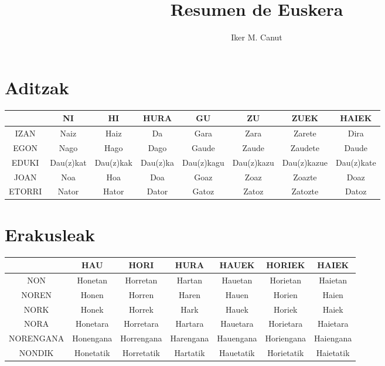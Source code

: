 \documentclass[12pt]{article}
\begin{document}
\author{Iker M. Canut}
\title{Resumen de Euskera}
\maketitle
\newpage

\tableofcontents
\newpage

\section{Aditzak}
\begin{table}[h]
\begin{center}
\begin{tabular}{|c||c|c|c|c|c|c|c|}
\hline
& NI & HI & HURA & GU & ZU & ZUEK & HAIEK \\
\hline \hline
IZAN & Naiz & Haiz & Da & Gara & Zara & Zarete & Dira \\
\hline
EGON & Nago & Hago & Dago & Gaude & Zaude & Zaudete & Daude \\
\hline
EDUKI & Dau(z)kat & Dau(z)kak & Dau(z)ka & Dau(z)kagu & Dau(z)kazu & Dau(z)kazue & Dau(z)kate \\
\hline
JOAN & Noa & Hoa & Doa & Goaz & Zoaz & Zoazte & Doaz \\
\hline
ETORRI & Nator & Hator & Dator & Gatoz & Zatoz & Zatozte & Datoz \\
\hline
\end{tabular}
\end{center}
\end{table}
\newpage

\section{Erakusleak}
\begin{table}[h]
\begin{center}
\begin{tabular}{|c|c|c|c|c|c|c|}
\hline
& HAU & HORI & HURA & HAUEK & HORIEK & HAIEK \\
\hline
NON & Honetan & Horretan & Hartan & Hauetan & Horietan & Haietan \\
\hline
NOREN & Honen & Horren & Haren & Hauen & Horien & Haien \\
\hline
NORK & Honek & Horrek & Hark & Hauek & Horiek & Haiek \\
\hline
NORA & Honetara & Horretara & Hartara & Hauetara & Horietara & Haietara \\ 
\hline
NORENGANA & Honengana & Horrengana & Harengana & Hauengana & Horiengana & Haiengana \\
\hline
NONDIK & Honetatik & Horretatik & Hartatik & Hauetatik & Horietatik & Haietatik \\
\hline
\end{tabular}
\end{center}
\end{table}
\newpage
\end{document}

